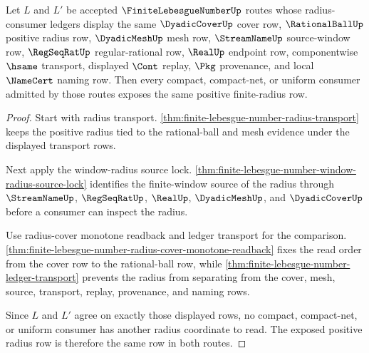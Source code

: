 \begin{theorem}
\label{thm:finite-lebesgue-number-radius-row-determinacy}
Let $L$ and $L'$ be accepted $\FiniteLebesgueNumberUp$ routes whose radius-consumer ledgers display the same $\DyadicCoverUp$ cover row, $\RationalBallUp$ positive radius row, $\DyadicMeshUp$ mesh row, $\StreamNameUp$ source-window row, $\RegSeqRatUp$ regular-rational row, $\RealUp$ endpoint row, componentwise $\hsame$ transport, displayed $\Cont$ replay, $\Pkg$ provenance, and local $\NameCert$ naming row. Then every compact, compact-net, or uniform consumer admitted by those routes exposes the same positive finite-radius row.
\end{theorem}
\begin{proof}
Start with radius transport. \autoref{thm:finite-lebesgue-number-radius-transport} keeps the positive radius tied to the rational-ball and mesh evidence under the displayed transport rows.

Next apply the window-radius source lock. \autoref{thm:finite-lebesgue-number-window-radius-source-lock} identifies the finite-window source of the radius through $\StreamNameUp$, $\RegSeqRatUp$, $\RealUp$, $\DyadicMeshUp$, and $\DyadicCoverUp$ before a consumer can inspect the radius.

Use radius-cover monotone readback and ledger transport for the comparison. \autoref{thm:finite-lebesgue-number-radius-cover-monotone-readback} fixes the read order from the cover row to the rational-ball row, while \autoref{thm:finite-lebesgue-number-ledger-transport} prevents the radius from separating from the cover, mesh, source, transport, replay, provenance, and naming rows.

Since $L$ and $L'$ agree on exactly those displayed rows, no compact, compact-net, or uniform consumer has another radius coordinate to read. The exposed positive radius row is therefore the same row in both routes.
\end{proof}

